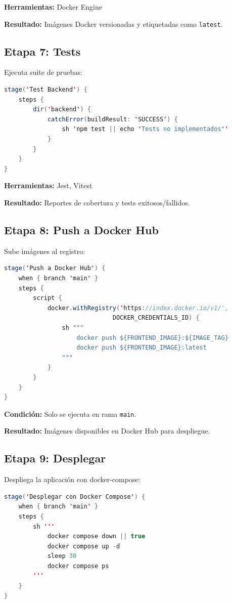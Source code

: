 \documentclass[12pt,a4paper]{article}
\begin{document}
\textbf{Herramientas:} Docker Engine

\textbf{Resultado:} Imágenes Docker versionadas y etiquetadas como \texttt{latest}.

\subsection{Etapa 7: Tests}

Ejecuta suite de pruebas:

\begin{lstlisting}[language=Java]
stage('Test Backend') {
    steps {
        dir('backend') {
            catchError(buildResult: 'SUCCESS') {
                sh 'npm test || echo "Tests no implementados"'
            }
        }
    }
}
\end{lstlisting}

\textbf{Herramientas:} Jest, Vitest

\textbf{Resultado:} Reportes de cobertura y tests exitosos/fallidos.

\subsection{Etapa 8: Push a Docker Hub}

Sube imágenes al registro:

\begin{lstlisting}[language=Java]
stage('Push a Docker Hub') {
    when { branch 'main' }
    steps {
        script {
            docker.withRegistry('https://index.docker.io/v1/', 
                              DOCKER_CREDENTIALS_ID) {
                sh """
                    docker push ${FRONTEND_IMAGE}:${IMAGE_TAG}
                    docker push ${FRONTEND_IMAGE}:latest
                """
            }
        }
    }
}
\end{lstlisting}

\textbf{Condición:} Solo se ejecuta en rama \texttt{main}.

\textbf{Resultado:} Imágenes disponibles en Docker Hub para despliegue.

\subsection{Etapa 9: Desplegar}

Despliega la aplicación con docker-compose:

\begin{lstlisting}[language=Java]
stage('Desplegar con Docker Compose') {
    when { branch 'main' }
    steps {
        sh '''
            docker compose down || true
            docker compose up -d
            sleep 30
            docker compose ps
        '''
    }
}
\end{lstlisting}
\end{document}
